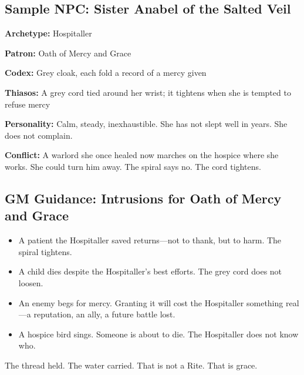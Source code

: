 \subsection{Sample NPC: Sister Anabel of the Salted Veil}

\textbf{Archetype:} Hospitaller

\textbf{Patron:} Oath of Mercy and Grace

\textbf{Codex:} Grey cloak, each fold a record of a mercy given

\textbf{Thiasos:} A grey cord tied around her wrist; it tightens when she is tempted to refuse mercy

\textbf{Personality:} Calm, steady, inexhaustible. She has not slept well in years. She does not complain.

\textbf{Conflict:} A warlord she once healed now marches on the hospice where she works. She could turn him away. The spiral says no. The cord tightens.

\subsection{GM Guidance: Intrusions for Oath of Mercy and Grace}

\begin{itemize}
\item A patient the Hospitaller saved returns—not to thank, but to harm. The spiral tightens.
\item A child dies despite the Hospitaller's best efforts. The grey cord does not loosen.
\item An enemy begs for mercy. Granting it will cost the Hospitaller something real—a reputation, an ally, a future battle lost.
\item A hospice bird sings. Someone is about to die. The Hospitaller does not know who.
\end{itemize}

The thread held. The water carried. That is not a Rite. That is grace.
